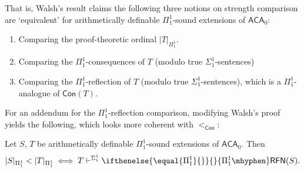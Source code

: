 \documentclass{mhkr}
\newcommand{\Con}{\mathsf{Con}}
\newcommand{\RFN}[1][]{\ifthenelse{\equal{#1}{}}{}{#1\mhyphen}\mathsf{RFN}}
\newcommand{\ACA}{\mathsf{ACA}}
\begin{document}
That is, Walsh's result claims the following three notions on strength comparison are `equivalent' for arithmetically definable $\Pi^1_1$-sound extensions of $\ACA_0$:
\begin{enumerate}
    \item Comparing the proof-theoretic ordinal $|T|_{\Pi^1_1}$.
    \item Comparing the $\Pi^1_1$-consequences of $T$ (modulo true $\Sigma^1_1$-sentences)
    \item Comparing the $\Pi^1_1$-reflection of $T$ (modulo true $\Sigma^1_1$-sentences), which is a $\Pi^1_1$-analogue of $\Con(T)$.
\end{enumerate}
For an addendum for the $\Pi^1_1$-reflection comparison, modifying Walsh's proof yields the following, which looks more coherent with $<_\Con$:
\begin{theorem} \label{Theorem: PTO strict comparison and Pi 1 1 reflection comparison} 
    Let $S$, $T$ be arithmetically definable $\Pi^1_1$-sound extensions of $\ACA_0$. Then 
    \begin{equation*}
        |S|_{\Pi^1_1} < |T|_{\Pi^1_1} \iff T \vdash^{\Sigma^1_1} \RFN[\Pi^1_1](S).
    \end{equation*}
\end{theorem}
\end{document}
